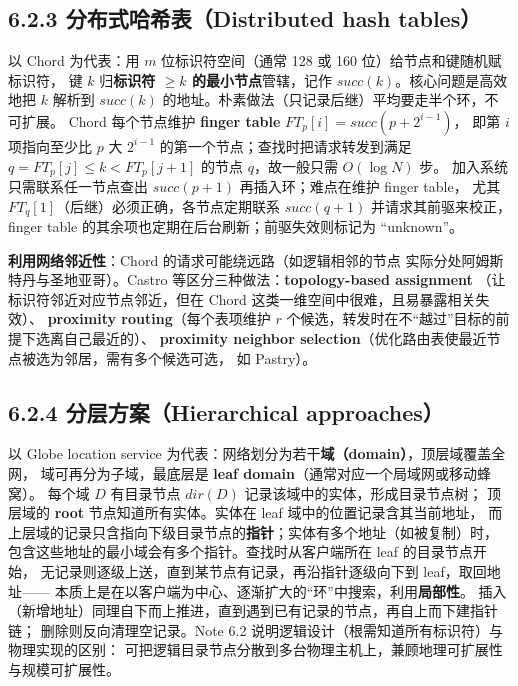 \subsection*{6.2.3 分布式哈希表（Distributed hash tables）}
以 Chord 为代表：用 $m$ 位标识符空间（通常 128 或 160 位）给节点和键随机赋标识符，
键 $k$ 归\textbf{标识符 $\ge k$ 的最小节点}管辖，记作 $succ(k)$。核心问题是高效地把 $k$
解析到 $succ(k)$ 的地址。朴素做法（只记录后继）平均要走半个环，不可扩展。
Chord 每个节点维护 \textbf{finger table} $FT_p[i] = succ(p + 2^{i-1})$，
即第 $i$ 项指向至少比 $p$ 大 $2^{i-1}$ 的第一个节点；查找时把请求转发到满足
$q = FT_p[j] \le k < FT_p[j+1]$ 的节点 $q$，故一般只需 $O(\log N)$ 步。
加入系统只需联系任一节点查出 $succ(p+1)$ 再插入环；难点在维护 finger table，
尤其 $FT_q[1]$（后继）必须正确，各节点定期联系 $succ(q+1)$ 并请求其前驱来校正，
finger table 的其余项也定期在后台刷新；前驱失效则标记为 “unknown”。

\medskip\noindent \textbf{利用网络邻近性}：Chord 的请求可能绕远路（如逻辑相邻的节点
实际分处阿姆斯特丹与圣地亚哥）。Castro 等区分三种做法：\textbf{topology-based assignment}
（让标识符邻近对应节点邻近，但在 Chord 这类一维空间中很难，且易暴露相关失效）、
\textbf{proximity routing}（每个表项维护 $r$ 个候选，转发时在不“越过”目标的前提下选离自己最近的）、
\textbf{proximity neighbor selection}（优化路由表使最近节点被选为邻居，需有多个候选可选，
如 Pastry）。

\begin{closeread}
\end{closeread}

\subsection*{6.2.4 分层方案（Hierarchical approaches）}
以 Globe location service 为代表：网络划分为若干\textbf{域（domain）}，顶层域覆盖全网，
域可再分为子域，最底层是 \textbf{leaf domain}（通常对应一个局域网或移动蜂窝）。
每个域 $D$ 有目录节点 $dir(D)$ 记录该域中的实体，形成目录节点树；
顶层域的 \textbf{root} 节点知道所有实体。实体在 leaf 域中的位置记录含其当前地址，
而上层域的记录只含指向下级目录节点的\textbf{指针}；实体有多个地址（如被复制）时，
包含这些地址的最小域会有多个指针。查找时从客户端所在 leaf 的目录节点开始，
无记录则逐级上送，直到某节点有记录，再沿指针逐级向下到 leaf，取回地址——
本质上是在以客户端为中心、逐渐扩大的“环”中搜索，利用\textbf{局部性}。
插入（新增地址）同理自下而上推进，直到遇到已有记录的节点，再自上而下建指针链；
删除则反向清理空记录。Note 6.2 说明逻辑设计（根需知道所有标识符）与物理实现的区别：
可把逻辑目录节点分散到多台物理主机上，兼顾地理可扩展性与规模可扩展性。

